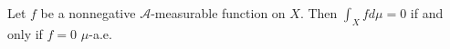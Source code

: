 Let $f$ be a nonnegative $\mathcal{A}$-measurable function on $X$. Then $\int_X f d\mu = 0$ if and only if $f = 0$ $\mu$-a.e.
